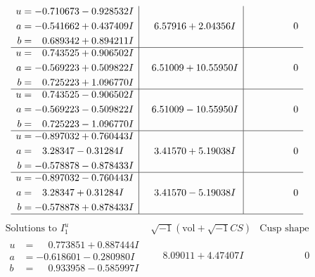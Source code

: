 \documentclass[1p]{elsarticle_modified}
\theoremstyle{definition}
\newcommand{\I}{\sqrt{-1}}
\begin{document}
$$\begin{array}{c|c|c}
\begin{aligned}
u &= -0.710673 - 0.928532 I \\
a &= -0.541662 + 0.437409 I \\
b &= \phantom{-}0.689342 + 0.894211 I\end{aligned}
 & \phantom{-}6.57916 + 2.04356 I & \phantom{-0.000000 } 0 \\ \hline\begin{aligned}
u &= \phantom{-}0.743525 + 0.906502 I \\
a &= -0.569223 + 0.509822 I \\
b &= \phantom{-}0.725223 + 1.096770 I\end{aligned}
 & \phantom{-}6.51009 + 10.55950 I & \phantom{-0.000000 } 0 \\ \hline\begin{aligned}
u &= \phantom{-}0.743525 - 0.906502 I \\
a &= -0.569223 - 0.509822 I \\
b &= \phantom{-}0.725223 - 1.096770 I\end{aligned}
 & \phantom{-}6.51009 - 10.55950 I & \phantom{-0.000000 } 0 \\ \hline\begin{aligned}
u &= -0.897032 + 0.760443 I \\
a &= \phantom{-}3.28347 - 0.31284 I \\
b &= -0.578878 - 0.878433 I\end{aligned}
 & \phantom{-}3.41570 + 5.19038 I & \phantom{-0.000000 } 0 \\ \hline\begin{aligned}
u &= -0.897032 - 0.760443 I \\
a &= \phantom{-}3.28347 + 0.31284 I \\
b &= -0.578878 + 0.878433 I\end{aligned}
 & \phantom{-}3.41570 - 5.19038 I & \phantom{-0.000000 } 0\\
 \hline 
 \end{array}$$\newpage$$\begin{array}{c|c|c}  
\text{Solutions to }I^u_{1}& \I (\text{vol} + \sqrt{-1}CS) & \text{Cusp shape}\\
 \hline 
\begin{aligned}
u &= \phantom{-}0.773851 + 0.887444 I \\
a &= -0.618601 - 0.280980 I \\
b &= \phantom{-}0.933958 - 0.585997 I\end{aligned}
 & \phantom{-}8.09011 + 4.47407 I & \phantom{-0.000000 } 0 \\ \hline\begin{aligned}

\end{aligned}
\end{array}$$
\end{document}
